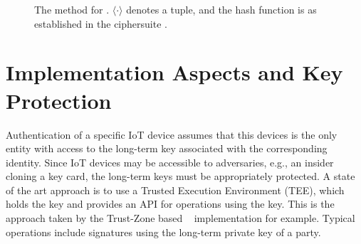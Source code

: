 \begin{figure}[ht]
{
}
    \caption{The \mSigStat{} method for \mEdhoc{}. $\langle\cdot\rangle$ 
denotes a tuple, and the hash function \mHash{} is as established in the 
ciphersuite \mSuites{}.~\cite{Norr21}}
\label{fig:edhocsigstat}
\end{figure}

\section{Implementation Aspects and Key Protection}
\label{sec:TEE}
Authentication of a specific IoT device assumes that this devices is the only
entity with access to the long-term key associated with the corresponding
identity.
%
Since IoT devices may be accessible to adversaries, e.g., an insider cloning a
key card, the long-term keys must be appropriately protected.
%
A state of the art approach is to use a Trusted Execution Environment (TEE),
which holds the key and provides an API for operations using the key.
%
This is the approach taken by the
Trust-Zone based \mMuEdhoc{}~\cite{DBLP:conf/codaspy/Hristozov0XFLS21}
implementation for example.
%
Typical operations include signatures using the long-term private key of a
party.
%

